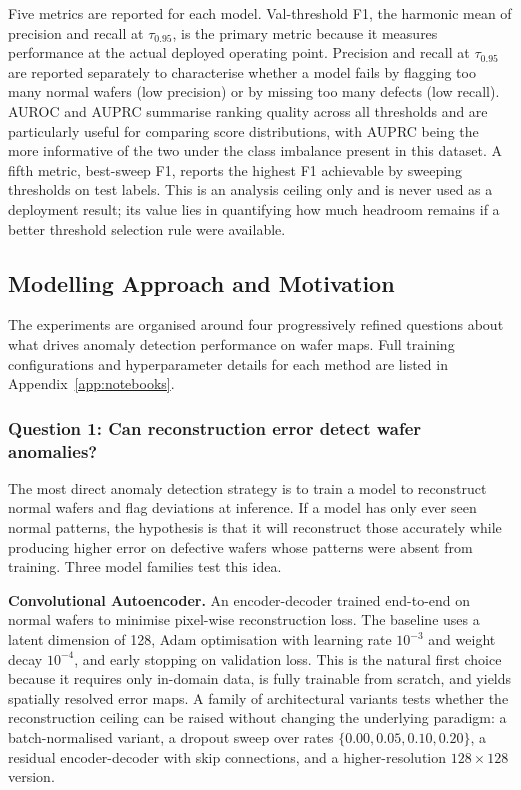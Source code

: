 \documentclass[11pt]{article}
\begin{document}
Five metrics are reported for each model. Val-threshold F1, the harmonic mean
of precision and recall at $\tau_{0.95}$, is the primary metric because it
measures performance at the actual deployed operating point. Precision and
recall at $\tau_{0.95}$ are reported separately to characterise whether a
model fails by flagging too many normal wafers (low precision) or by missing
too many defects (low recall). AUROC and AUPRC summarise ranking quality
across all thresholds and are particularly useful for comparing score
distributions, with AUPRC being the more informative of the two under
the class imbalance present in this dataset. A fifth metric, best-sweep F1,
reports the highest F1 achievable by sweeping thresholds on test labels.
This is an analysis ceiling only and is never used as a deployment result;
its value lies in quantifying how much headroom remains if a better threshold
selection rule were available.

\subsection{Modelling Approach and Motivation}

The experiments are organised around four progressively refined questions
about what drives anomaly detection performance on wafer maps. Full
training configurations and hyperparameter details for each method are
listed in Appendix~\ref{app:notebooks}.

\subsubsection{Question 1: Can reconstruction error detect wafer anomalies?}

The most direct anomaly detection strategy is to train a model to reconstruct
normal wafers and flag deviations at inference. If a model has only ever
seen normal patterns, the hypothesis is that it will reconstruct those
accurately while producing higher error on defective wafers whose patterns
were absent from training. Three model families test this idea.

\textbf{Convolutional Autoencoder.} An encoder-decoder trained end-to-end
on normal wafers to minimise pixel-wise reconstruction loss. The baseline
uses a latent dimension of 128, Adam optimisation with learning rate
$10^{-3}$ and weight decay $10^{-4}$, and early stopping on validation loss.
This is the natural first choice because it requires only in-domain data,
is fully trainable from scratch, and yields spatially resolved error maps.
A family of architectural variants tests whether the reconstruction ceiling
can be raised without changing the underlying paradigm: a batch-normalised
variant, a dropout sweep over rates $\{0.00, 0.05, 0.10, 0.20\}$, a residual
encoder-decoder with skip connections, and a higher-resolution
$128\!\times\!128$ version.
\end{document}
